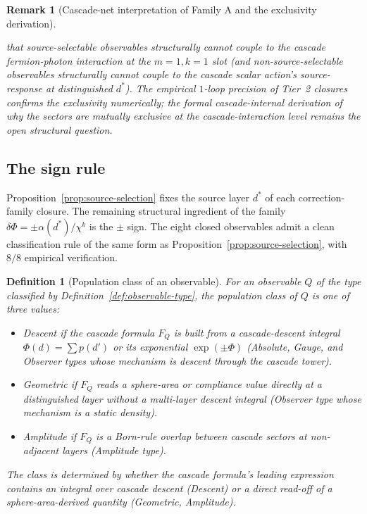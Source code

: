 \documentclass[12pt,a4paper]{article}
\newtheorem{definition}[theorem]{Definition}
\newtheorem*{remark}{Remark}
\begin{document}
\begin{remark}[Cascade-net interpretation of Family A and the exclusivity derivation]
\begin{itemize}[nosep]
that source-selectable observables structurally cannot couple to the
cascade fermion-photon interaction at the $m=1, k=1$ slot (and
non-source-selectable observables structurally cannot couple to the
cascade scalar action's source-response at distinguished $d^*$). The
empirical $1$-loop precision of Tier~2 closures confirms the
exclusivity numerically; the formal cascade-internal derivation of
\emph{why} the sectors are mutually exclusive at the cascade-interaction
level remains the open structural question.
\end{itemize}
\end{remark}

\subsection{The sign rule}\label{subsec:sign-rule}

Proposition~\ref{prop:source-selection} fixes the source layer $d^*$ of
each correction-family closure. The remaining structural ingredient of
the family $\delta\Phi = \pm\alpha(d^*)/\chi^k$ is the $\pm$ sign. The
eight closed observables admit a clean classification rule of the
same form as Proposition~\ref{prop:source-selection}, with $8/8$
empirical verification.

\begin{definition}[Population class of an observable]\label{def:population-class}
For an observable $Q$ of the type classified by
Definition~\ref{def:observable-type}, the \emph{population class} of $Q$
is one of three values:
\begin{itemize}
\item \emph{Descent} if the cascade formula $F_Q$ is built from a
  cascade-descent integral $\Phi(d) = \sum p(d')$ or its exponential
  $\exp(\pm\Phi)$ (Absolute, Gauge, and Observer types whose mechanism
  is descent through the cascade tower).
\item \emph{Geometric} if $F_Q$ reads a sphere-area or compliance value
  directly at a distinguished layer without a multi-layer descent
  integral (Observer type whose mechanism is a static density).
\item \emph{Amplitude} if $F_Q$ is a Born-rule overlap between cascade
  sectors at non-adjacent layers (Amplitude type).
\end{itemize}
The class is determined by whether the cascade formula's leading
expression contains an integral over cascade descent (Descent) or a
direct read-off of a sphere-area-derived quantity (Geometric, Amplitude).
\end{definition}
\end{document}
